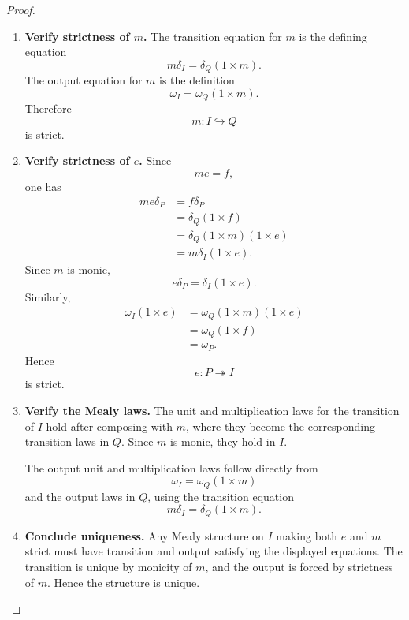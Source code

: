 \begin{proof}
\begin{enumerate}
        \item \textbf{Verify strictness of \(m\).}
        The transition equation for \(m\) is the defining equation
        \[
            m\delta_I
            =
            \delta_Q(1\times m).
        \]
        The output equation for \(m\) is the definition
        \[
            \omega_I
            =
            \omega_Q(1\times m).
        \]
        Therefore
        \[
            m:I\hookrightarrow Q
        \]
        is strict.

        \item \textbf{Verify strictness of \(e\).}
        Since
        \[
            me=f,
        \]
        one has
        \[
        \begin{aligned}
            me\delta_P
            &=
            f\delta_P \\
            &=
            \delta_Q(1\times f) \\
            &=
            \delta_Q(1\times m)(1\times e) \\
            &=
            m\delta_I(1\times e).
        \end{aligned}
        \]
        Since \(m\) is monic,
        \[
            e\delta_P=\delta_I(1\times e).
        \]
        Similarly,
        \[
        \begin{aligned}
            \omega_I(1\times e)
            &=
            \omega_Q(1\times m)(1\times e) \\
            &=
            \omega_Q(1\times f) \\
            &=
            \omega_P.
        \end{aligned}
        \]
        Hence
        \[
            e:P\twoheadrightarrow I
        \]
        is strict.

        \item \textbf{Verify the Mealy laws.}
        The unit and multiplication laws for the transition of \(I\) hold after
        composing with \(m\), where they become the corresponding transition
        laws in \(Q\). Since \(m\) is monic, they hold in \(I\).

        The output unit and multiplication laws follow directly from
        \[
            \omega_I=\omega_Q(1\times m)
        \]
        and the output laws in \(Q\), using the transition equation
        \[
            m\delta_I=\delta_Q(1\times m).
        \]

        \item \textbf{Conclude uniqueness.}
        Any Mealy structure on \(I\) making both \(e\) and \(m\) strict must
        have transition and output satisfying the displayed equations. The
        transition is unique by monicity of \(m\), and the output is forced by
        strictness of \(m\). Hence the structure is unique.
    \end{enumerate}
\end{proof}

